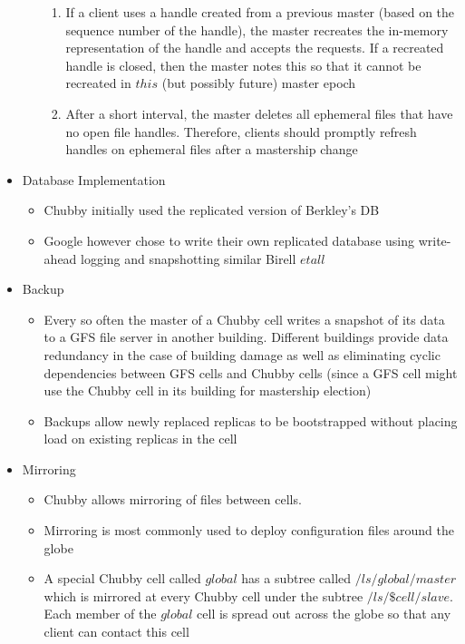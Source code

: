 \documentclass[a4paper]{article}
\begin{document}
\begin{itemize}
\begin{itemize}
\begin{enumerate}
\item If a client uses a handle created from a previous master (based on the sequence number of the handle), the master recreates the in-memory representation of the handle and accepts the requests. If a recreated handle is closed, then the master notes this so that it cannot be recreated in $this$ (but possibly future) master epoch

\item After a short interval, the master deletes all ephemeral files that have no open file handles. Therefore, clients should promptly refresh handles on ephemeral files after a mastership change
\end{enumerate}
\end{itemize}

\item Database Implementation
\begin{itemize}
\item Chubby initially used the replicated version of Berkley's DB

\item Google however chose to write their own replicated database using write-ahead logging and snapshotting similar Birell $et all$ 
\end{itemize}

\item Backup
\begin{itemize}
\item Every so often the master of a Chubby cell writes a snapshot of its data to a GFS file server in another building. Different buildings provide data redundancy in the case of building damage as well as eliminating cyclic dependencies between GFS cells and Chubby cells (since a GFS cell might use the Chubby cell in its building for mastership election)

\item Backups allow newly replaced replicas to be bootstrapped without placing load on existing replicas in the cell
\end{itemize}

\item Mirroring
\begin{itemize}
\item Chubby allows mirroring of files between cells.

\item Mirroring is most commonly used to deploy configuration files around the globe

\item A special Chubby cell called $global$ has a subtree called $/ls/global/master$ which is mirrored at every Chubby cell under the subtree $/ls/\$cell/slave$. Each member of the $global$ cell is spread out across the globe so that any client can contact this cell


\end{itemize}
\end{itemize}
\end{document}
